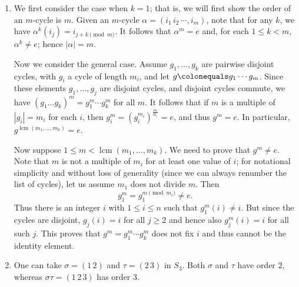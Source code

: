 \documentclass[11pt]{article}
\makeatletter
\renewenvironment{proof}[1][\proofname]{\par
  \vspace{-\topsep}%
  \pushQED{\qed}%
  \normalfont
  \topsep0pt \partopsep0pt %
  \trivlist
  \item[\hskip\labelsep
        \itshape
    #1\@addpunct{.}]\ignorespaces
}{%
  \popQED\endtrivlist\@endpefalse
  \addvspace{6pt plus 6pt} %
}
\DeclareMathOperator{\lcm}{lcm}
\theoremstyle{definition}
\makeatother
\begin{document}
\begin{proof}
\begin{enumerate}[label=(\alph*)]
\item
We first consider the case when $k = 1$; that is, we will first show the order of an $m$-cycle is $m$. Given an $m$-cycle $\alpha = (i_1 \, i_2 \, \cdots, i_m)$, note that for any $k$, we have $\alpha^k(i_j) = i_{j+k \pmod{m}}$.
It follows that $\alpha^m = e$ and, for each $1 \leqslant k < m$, $\alpha^k \neq e$; hence $|\alpha| =m$.

Now we consider the general case. Assume $g_1, \ldots, g_k$ are pairwise disjoint cycles, with $g_i$ a cycle of length $m_i$, and let $g \colonequals g_1 \cdots g_m$. Since these elements $g_1, \ldots, g_j$ are disjoint cycles, and disjoint cycles commute, we have $(g_1 \ldots g_k)^m = g_1^m \cdots g_k^m$ for all $m$. It follows that if $m$ is a multiple of $|g_i| = m_i$ for each $i$, then $g_i^m = (g_i^{m_i})^{\frac{m}{m_i}} = e$, and thus $g^m = e$. In particular, $g^{\lcm(m_1, \ldots, m_k)} = e$.

Now suppose $1 \leqslant m < \lcm(m_1, \dots, m_k)$. We need to prove that $g^m \neq e$. Note that $m$ is not a multiple of $m_i$ for at least one value of $i$; for notational simplicity and without loss of generality (since we can always renumber the list of cycles), let us assume $m_1$ does not divide $m$. Then 
$$g_1^m = g_1^{m \pmod{m_i}} \neq e.$$ 
Thus there is an integer $i$ with $1 \leqslant i \leqslant n$ such that $g_1^m(i) \neq i$. But since the cycles are disjoint, $g_j(i) = i$ for all $j \geqslant 2$ and hence also $g_j^m(i) = i$ for all such $j$.
This proves that $g^m = g_1^m \cdots g_k^m$ does not fix $i$ and thus cannot be the identity element.

\item One can take $\sigma=(1 \, 2)$ and $\tau=(2\, 3)$ in $S_3$. Both $\sigma$ and $\tau$ have order $2$, whereas $\sigma\tau=(1 \, 2 \, 3)$ has order $3$.
\end{enumerate}
\end{proof}
\end{document}
